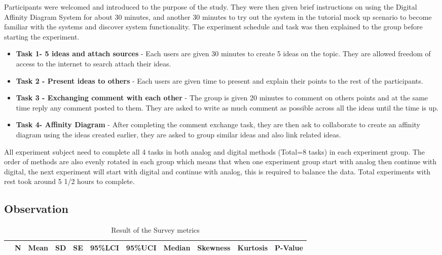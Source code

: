 \documentclass{sigchi}
\begin{document}
\begin{itemize}
\begin{itemize}
Participants were welcomed and introduced to the purpose of the study. They were then given brief instructions on using the Digital Affinity Diagram System for about 30 minutes, and another 30 minutes to try out the system in the tutorial mock up scenario to become familiar with the systems and discover system functionality. The experiment schedule and task was then explained to the group before starting the experiment. 

\begin{itemize}
\item \textbf{Task 1- 5 ideas and attach sources} - Each users are given 30 minutes to create 5 ideas on the topic. They are allowed freedom of access to the internet to search attach their ideas. 
\item \textbf{Task 2 - Present  ideas to others } - Each users are given time to present and explain their points to the rest of the participants. 
\item \textbf{Task 3 - Exchanging comment with each other} - The group is given 20 minutes to comment on others points and at the same time reply any comment posted to them. They are asked to write as much comment as possible across all the ideas until the time is up. 

\item \textbf{Task 4- Affinity Diagram} - After completing the comment exchange task, they are then ask to collaborate to create an affinity diagram using the ideas created earlier, they are asked to group similar ideas and also link related ideas. 
\end{itemize}
All experiment subject need to complete all 4 tasks in both analog and digital methods (Total=8 tasks) in each experiment group. The order of methods are also evenly rotated in each group which means that when one experiment group start with analog then continue with digital, the next experiment will start with digital and continue with analog, this is required to balance the data. Total experiments with rest took around 5 1/2 hours to complete. 

\subsection{Observation}

\begin{table}[ht]
\centering
\caption {Result of the Survey metrics}
\begin{tabular}{rrrrrrrrrrr}
  \hline
 & N & Mean & SD & SE & 95\%LCI & 95\%UCI & Median & Skewness & Kurtosis & P-Value \\ 
  \hline
  

\end{tabular}
\end{table}
\end{itemize}
\end{itemize}
\end{document}

